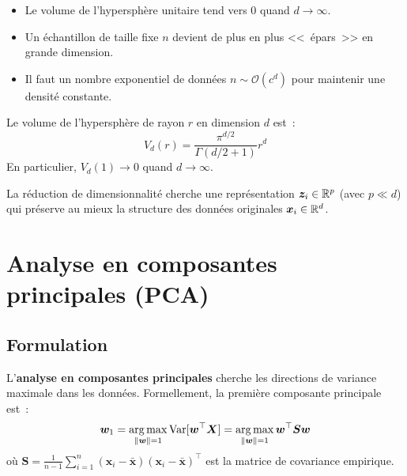\begin{intuition}[title=\textbf{Cons\'equences pratiques}]
\begin{itemize}
  \item Le volume de l'hypersph\`ere unitaire tend vers $0$ quand $d \to \infty$.
  \item Un \'echantillon de taille fixe $n$ devient de plus en plus
    <<~\'epars~>> en grande dimension.
  \item Il faut un nombre exponentiel de donn\'ees $n \sim \mathcal{O}(c^d)$
    pour maintenir une densit\'e constante.
\end{itemize}
\end{intuition}

\begin{proposition}
Le volume de l'hypersph\`ere de rayon $r$ en dimension $d$ est~:
\begin{equation}
  V_d(r) = \frac{\pi^{d/2}}{\Gamma(d/2 + 1)} r^d
\end{equation}
En particulier, $V_d(1) \to 0$ quand $d \to \infty$.
\end{proposition}

La r\'eduction de dimensionnalit\'e cherche une repr\'esentation
$\bm{z}_i \in \mathbb{R}^p$ (avec $p \ll d$) qui pr\'eserve au mieux la structure
des donn\'ees originales $\bm{x}_i \in \mathbb{R}^d$.

\section{Analyse en composantes principales (PCA)}
\label{sec:pca}

\subsection{Formulation}

\begin{definition}[PCA]
L'\textbf{analyse en composantes principales} cherche les directions de
variance maximale dans les donn\'ees. Formellement, la premi\`ere composante
principale est~:
\begin{equation}
  \bm{w}_1 = \operatorname*{arg\,max}_{\left\| \bm{w} \right\| = 1} \mathrm{Var}[\bm{w}^\top \bm{X}]
  = \operatorname*{arg\,max}_{\left\| \bm{w} \right\| = 1} \bm{w}^\top \bm{S} \bm{w}
  \label{eq:pca-obj}
\end{equation}
o\`u $\bm{S} = \frac{1}{n-1}\sum_{i=1}^n (\bm{x}_i - \bar{\bm{x}})
(\bm{x}_i - \bar{\bm{x}})^\top$ est la matrice de covariance empirique.
\end{definition}


